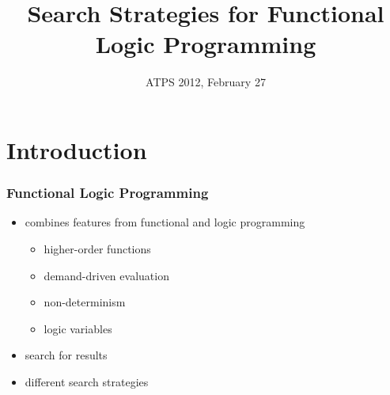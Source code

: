 \documentclass[
,hyperref={pdfpagelabels=false}
]{beamer}
\title[Search Strategies for FLP]
{Search Strategies for Functional Logic Programming}
\date[ATPS 2012]{ATPS 2012, February 27}
\author[Hanus, Peemöller, \underline{Reck}]{%
\texorpdfstring
  {Michael Hanus \and Björn Peemöller \and \underline{Fabian Reck}}
  {Michael Hanus \and Björn Peemöller \and Fabian Reck}
}
\institute{Kiel University}
\begin{document}
\begin{frame}%
\titlepage
\end{frame}


\section{Introduction}

\begin{frame}[fragile]%
\frametitle{Functional Logic Programming}
\begin{itemize}
\item combines features from functional and logic programming
  \begin{itemize}
   \item higher-order functions
   \item demand-driven evaluation
   \item non-determinism
   \item logic variables
  \end{itemize}
\item search for results
\item different search strategies
\end{itemize}
\end{frame}
\end{document}
